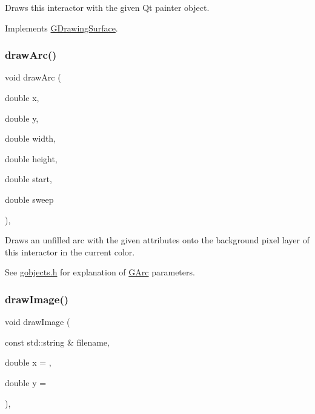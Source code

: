 Draws this interactor with the given Qt painter object. 



Implements \mbox{\hyperlink{classGDrawingSurface}{G\+Drawing\+Surface}}.

\mbox{\label{classGDrawingSurface_a38b6fae1045191c57092b49905068144}} 
\subsubsection{\texorpdfstring{draw\+Arc()}{drawArc()}}
{\footnotesize\ttfamily void draw\+Arc (\begin{DoxyParamCaption}\item[{double}]{x,  }\item[{double}]{y,  }\item[{double}]{width,  }\item[{double}]{height,  }\item[{double}]{start,  }\item[{double}]{sweep }\end{DoxyParamCaption})\hspace{0.3cm}{\ttfamily [virtual]}, {\ttfamily [inherited]}}



Draws an unfilled arc with the given attributes onto the background pixel layer of this interactor in the current color. 

See \mbox{\hyperlink{gobjects_8h_source}{gobjects.\+h}} for explanation of \mbox{\hyperlink{classGArc}{G\+Arc}} parameters. \mbox{\label{classGDrawingSurface_abdd4cb1f2c64adc5d03522a1ee30febf}} 
\subsubsection{\texorpdfstring{draw\+Image()}{drawImage()}}
{\footnotesize\ttfamily void draw\+Image (\begin{DoxyParamCaption}\item[{const std\+::string \&}]{filename,  }\item[{double}]{x = {},  }\item[{double}]{y = {} }\end{DoxyParamCaption})\hspace{0.3cm}{\ttfamily [virtual]}, {\ttfamily [inherited]}}



